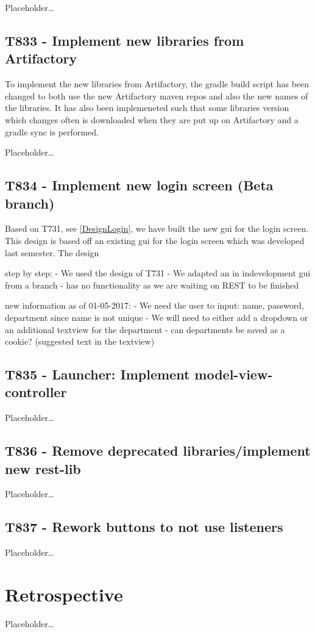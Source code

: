 Placeholder\ldots

\subsection{T833 - Implement new libraries from Artifactory}
To implement the new libraries from Artifactory, the gradle build script has
been changed to both use the new Artifactory maven repos and also the new names
of the libraries. It has also been implemeneted such that some libraries version
which changes often is downloaded when they are put up on Artifactory and a
gradle sync is performed.

Placeholder\ldots

\subsection{T834 - Implement new login screen (Beta branch)}
Based on T731, see \autoref{DesignLogin}, we have built the new gui for the
login screen. This design is based off an existing gui for the login screen
which was developed last semester. The design 

step by step:
- We used the design of T731
- We adapted an in indevelopment gui from a branch
- has no functionality as we are waiting on REST to be finished

new information as of 01-05-2017:
- We need the user to input: name, password, department
  since name is not unique
- We will need to either add a dropdown or an additional textview for the
  department
- can departments be saved as a cookie? (suggested text in the textview)


\subsection{T835 - Launcher: Implement model-view-controller}
Placeholder\ldots

\subsection{T836 - Remove deprecated libraries/implement new rest-lib}
Placeholder\ldots

\subsection{T837 - Rework buttons to not use listeners}
Placeholder\ldots

\section{Retrospective}
Placeholder\ldots